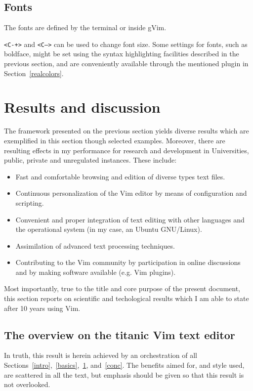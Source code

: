 \documentclass{article}
\newcommand{\ttt}[1] {
	\texttt{<#1>}}
\begin{document}
\subsection{Fonts}
The fonts are defined by the terminal or inside gVim.
\ttt{C-+} and \ttt{C--} can be used to change font size.
Some settings for fonts, such as boldface, might be set using
the syntax highlighting facilities described in the previous section,
and are conveniently available through the mentioned plugin in Section~\ref{realcolors}.

\section{Results and discussion}\label{res}
The framework presented on the previous section yields
diverse results which are exemplified in this section
though selected examples.
Moreover, there are resulting effects in my performance
for research and development in Universities, public, private and
unregulated instances.
These include:
\begin{itemize}
  \item Fast and comfortable browsing and edition of diverse types text files.
  \item Continuous personalization of the Vim editor by means of configuration and scripting.
  \item Convenient and proper integration of text editing with other languages and the operational system (in my case, an Ubuntu GNU/Linux).
  \item Assimilation of advanced text processing techniques.
  \item Contributing to the Vim community by participation in online discussions and by making software available (e.g. Vim plugins).
\end{itemize}

Most importantly, true to the title and core purpose of the present document,
this section reports on scientific
and techological results which I am able to state after
10 years using Vim.

\subsection{The overview on the titanic Vim text editor}
In truth, this result is herein achieved by an orchestration of
all Sections~\ref{intro},~\ref{basics},~\ref{res}, and~\ref{conc}.
The benefits aimed for, and style used, are scattered in all the text,
but emphasis should be given so that this result is not overlooked.
\end{document}
